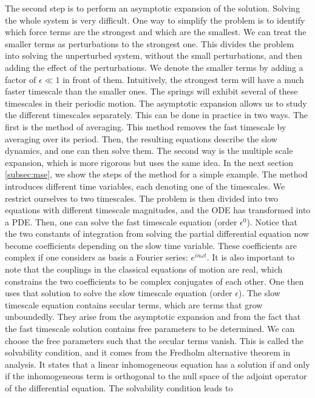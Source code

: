 \documentclass[11pt, a4paper]{article} %
\begin{document}
The second step is to perform an asymptotic expansion of the solution. Solving the whole system is very difficult. 
One way to simplify the problem is to identify which force terms are the strongest and which are the smallest. 
We can treat the smaller terms as perturbations to the strongest one. This divides the problem into solving the 
unperturbed system, without the small perturbations, and then adding the effect of the perturbations. 
We denote the smaller terms by adding a factor of $\epsilon \ll 1$ in front of them. 
Intuitively, the strongest term will have a much faster timescale than the smaller ones. The springs will 
exhibit several of these timescales in their periodic motion. The asymptotic expansion allows us to study the 
different timescales separately. This can be done in practice in two ways. The first is the method of averaging. 
This method removes the fast timescale by averaging over its period. Then, the resulting equations 
describe the slow dynamics, and one can then solve them. 
The second way is the multiple scale expansion, which is more rigorous but uses the same idea. 
In the next section \ref{subsec:mse}, we show the steps of the method for a simple example. The method introduces 
different time variables, each denoting one of the timescales. We restrict ourselves to two timescales. 
The problem is then divided into two equations with different timescale magnitudes, and the ODE has transformed into a PDE.
Then, one can solve the fast timescale equation (order $\epsilon^0$). Notice that the two constants of integration from solving the 
partial differential equation now become coefficients depending on the slow time variable. These coefficients 
are complex if one considers as basis a Fourier series: $e^{in\omega t}$. It is also important to note 
that the couplings in the classical equations of motion are real, which constrains the two coefficients 
to be complex conjugates of each other.  
One then uses that solution to solve the slow timescale equation (order $\epsilon$). The slow timescale 
equation contains secular terms, which are terms that grow unboundedly. They arise from the asymptotic expansion and 
from the fact that the fast timescale solution contains free parameters to be determined. We can choose 
the free parameters such that the secular terms vanish. This is called the solvability condition, and 
it comes from the Fredholm alternative theorem in analysis. It states that 
a linear inhomogeneous equation has a solution if and only if the inhomogeneous term is orthogonal to the null 
space of the adjoint operator of the differential equation. The solvability condition leads to 
\end{document}
